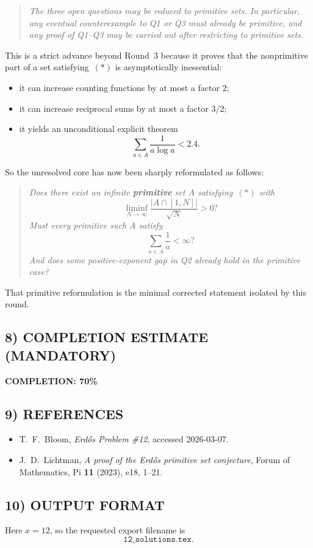 \begin{quote}
\emph{The three open questions may be reduced to primitive sets. In particular, any eventual counterexample to Q1 or Q3 must already be primitive, and any proof of Q1--Q3 may be carried out after restricting to primitive sets.}
\end{quote}

This is a strict advance beyond Round~3 because it proves that the nonprimitive part of a set satisfying~$(*)$ is asymptotically inessential:
\begin{itemize}
\item it can increase counting functions by at most a factor $2$;
\item it can increase reciprocal sums by at most a factor $3/2$;
\item it yields an unconditional explicit theorem
\[
\sum_{a\in A}\frac1{a\log a}<2.4.
\]
\end{itemize}

So the unresolved core has now been sharply reformulated as follows:
\begin{quote}
\emph{Does there exist an infinite \textbf{primitive} set $A$ satisfying~$(*)$ with}
\[
\liminf_{N\to\infty}\frac{|A\cap[1,N]|}{\sqrt N}>0?
\]
\emph{Must every primitive such $A$ satisfy}
\[
\sum_{a\in A}\frac1a<\infty?
\]
\emph{And does some positive-exponent gap in Q2 already hold in the primitive case?}
\end{quote}

That primitive reformulation is the minimal corrected statement isolated by this round.

\subsection*{8) COMPLETION ESTIMATE (MANDATORY)}

\noindent\textbf{COMPLETION: 70\%}

\subsection*{9) REFERENCES}

\begin{itemize}
\item T.~F.~Bloom, \emph{Erd\H{o}s Problem \#12}, accessed 2026-03-07.
\item J.~D.~Lichtman, \emph{A proof of the Erd\H{o}s primitive set conjecture}, Forum of Mathematics, Pi \textbf{11} (2023), e18, 1--21.
\end{itemize}

\subsection*{10) OUTPUT FORMAT}

Here $x=12$, so the requested export filename is
\[
\texttt{12\_solutions.tex}.
\]
